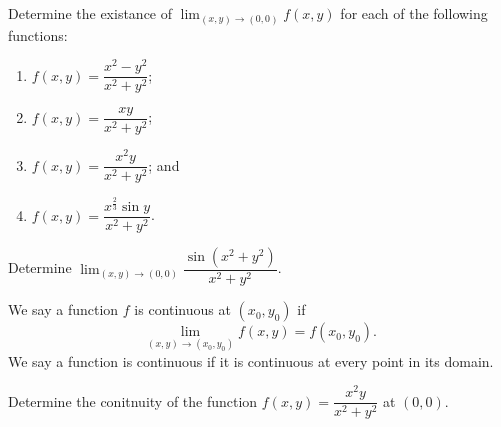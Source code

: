 \documentclass[11pt]{article}
\theoremstyle{break}
\numberwithin{equation}{theorem}
\begin{document}
\begin{example}
    Determine the existance of $\displaystyle\lim_{(x, y)\to(0, 0)}f(x, y)$ for each of the following functions:
    \begin{enumerate}
        \item $f(x, y)=\dfrac{x^2-y^2}{x^2+y^2}$;
        \item $f(x, y)=\dfrac{xy}{x^2+y^2}$;
        \item $f(x, y)=\dfrac{x^2y}{x^2+y^2}$; and
        \item $f(x, y)=\dfrac{x^\frac{2}{3}\sin y}{x^2+y^2}$.
    \end{enumerate}
\end{example}
\vspace{15em}

\begin{example}
    Determine $\displaystyle\lim_{(x, y)\to(0, 0)}\dfrac{\sin(x^2+y^2)}{x^2+y^2}$.
\end{example}
\vspace{8em}

\begin{definition}[Continuity]
    We say a function $f$ is continuous at $(x_0, y_0)$ if $$\lim_{(x, y)\to(x_0, y_0)}f(x, y)=f(x_0, y_0).$$ We say a function is continuous if it is continuous at every point in its domain.
\end{definition}

\begin{example}
    Determine the conitnuity of the function $f(x, y)=\dfrac{x^2y}{x^2+y^2}$ at $(0, 0)$.
\end{example}
\end{document}

